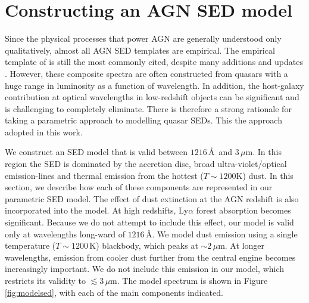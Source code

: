 \section{Constructing an AGN SED model}

Since the physical processes that power AGN are generally understood only qualitatively, almost all AGN SED templates are empirical. 
The empirical template of \citet{elvis94} is still the most commonly cited, despite many additions and updates \citep[e.g.][]{polletta00, kuraszkiewicz03, risaliti04, richards06,  polletta07, lusso10, shang11, marchese12, trichas12}. 
However, these composite spectra are often constructed from quasars with a huge range in luminosity as a function of wavelength. 
In addition, the host-galaxy contribution at optical wavelengths in low-redshift objects can be significant and is challenging to completely eliminate. 
There is therefore a strong rationale for taking a parametric approach to modelling quasar SEDs. 
This the approach adopted in this work. 

We construct an SED model that is valid between $1216$\,\AA\, and $3$\,$\mu$m.
In this region the SED is dominated by the accretion disc, broad ultra-violet/optical emission-lines and thermal emission from the hottest ($T\sim1200$K) dust. 
In this section, we describe how each of these components are represented in our parametric SED model.  
The effect of dust extinction at the AGN redshift is also incorporated into the model. 
At high redshifts, Ly$\alpha$ forest absorption becomes significant. 
Because we do not attempt to include this effect, our model is valid only at wavelengths long-ward of $1216$\,\AA. 
We model dust emission using a single temperature ($T\sim1200$\,K) blackbody, which peaks at $\sim2$\,$\mu$m. 
At longer wavelengths, emission from cooler dust further from the central engine becomes increasingly important. 
We do not include this emission in our model, which restricts its validity to $\lesssim3$\,$\mu$m.
The model spectrum is shown in Figure \ref{fig:modelsed}, with each of the main components indicated. 

